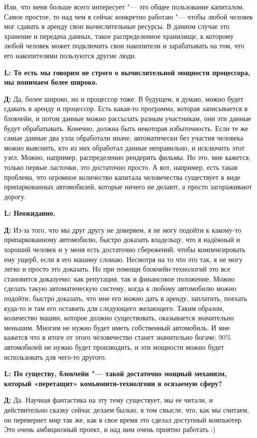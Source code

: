 \documentclass[10pt, a5paper]{article}
\begin{document}
Или, что меня больше всего интересует "--- это общее пользование капиталом. Самое простое, то над чем я сейчас конкретно работаю "--- чтобы любой человек мог сдавать в аренду свои вычислительные ресурсы. В данном случае это хранение и передача данных,  такое распределенное хранилище, к которому любой человек может подключить свои накопители и зарабатывать на том, что его накопителями пользуются другие люди.

{\noindent \bf L: То есть мы говорим не строго о вычислительной мощности процессора, мы понимаем более широко.}

{\noindent \bf Д:} Да, более широко, но и процессор тоже. В будущем, я думаю, можно будет сдавать в аренду и процессор. Есть какая-то программа, которая записывается в блокчейн, и потом данные можно рассылать разным участникам, они эти данные будут обрабатывать. Конечно, должна быть некоторая избыточность. Если те же  самые данные два узла обработали иначе, автоматически без участия человека можно выяснить, кто из них обработал данные неправильно, и исключить этот узел. Можно, например, распределенно рендерить фильмы. Но это, мне кажется, только первые ласточки, это достаточно просто. А вот, например, есть такая проблема, что огромное количество капитала человечества существует в виде припаркованных автомобилей, которые ничего не делают, а просто загораживают дорогу.

{\noindent \bf L: Неожиданно.}

{\noindent \bf Д:} Из-за того, что мы друг другу не доверяем, я не могу подойти к какому-то припаркованному автомобилю, быстро доказать владельцу, что я надёжный и хороший человек и у меня есть достаточно сбережений, чтобы компенсировать ему ущерб, если я его машину сломаю. Несмотря на то что это так, я не могу легко и просто это доказать. Но при помощи блокчейн-технологий это все становится доказуемо: как репутация, так и финансовое положение. Можно сделать такую автоматическую систему, когда к любому автомобилю можно подойти, быстро доказать, что мне его можно дать в аренду, заплатить, поехать куда-то и там его оставить для следующего желающего. Таким образом, количество машин, которое должно существовать, оказывается значительно меньшим. Многим не нужно будет иметь собственный автомобиль. И мне кажется что в итоге от этого человечество станет значительно богаче:  90\% автомобилей не нужно будет производить, и эти мощности можно будет использовать для чего-то другого.

{\noindent \bf L: По существу, блокчейн "--- такой достаточно мощный механизм, который «перетащит» комьюнити-технолгоии в \linebreak осязаемую сферу?}

{\noindent \bf Д:} Да. Научная фантастика на эту тему существует, мы ее читали, и действительно сказку сейчас делаем былью, в том смысле, что, как мы  считаем, он перевернет мир так же, как в свое время это сделал доступный компьютер. Это очень амбициозный проект, и над ним очень приятно работать :)

 
\end{document}
